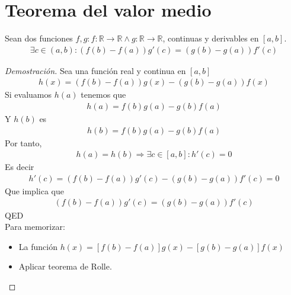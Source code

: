 \documentclass{article}
\begin{document}
\section{Teorema del valor medio}
    Sean dos funciones $f,g : f: \mathbb{R} \to \mathbb{R} \wedge g: \mathbb{R} \to \mathbb{R}$, continuas y derivables en $[a,b]$.
    \begin{equation}
        \begin{split}
            \exists c \in (a,b): (f(b)-f(a))g'(c) = (g(b) - g(a))f'(c)
        \end{split}
    \end{equation}
\begin{proof}[Demostración]
    Sea una función real y continua en $[a,b]$
    \begin{equation}
        \begin{split}
            h(x)= (f(b)-f(a))g(x)- (g(b)-g(a))f(x)
        \end{split}
    \end{equation}
    Si evaluamos $h(a)$ tenemos que
    \begin{equation}
        \begin{split}
            h(a)= f(b)g(a)-g(b)f(a)
        \end{split}
    \end{equation}
    Y $h(b)$ es
    \begin{equation}
        \begin{split}
            h(b)=f(b)g(a)-g(b)f(a)
        \end{split}
    \end{equation}
    Por tanto,
    \begin{equation}
        \begin{split}
            h(a)=h(b)\Rightarrow \exists c \in [a,b] : h'(c)=0
        \end{split}
    \end{equation}
    Es decir
    \begin{equation}
        \begin{split}
            h'(c)=(f(b)-f(a))g'(c)- (g(b)-g(a))f'(c)=0
        \end{split}
    \end{equation}
    Que implica que
    \begin{equation}
        \begin{split}
            (f(b)-f(a))g'(c)=(g(b)-g(a))f'(c)
        \end{split}
    \end{equation}
    QED\\
    Para memorizar:
    \begin{itemize}
	    \item La función $h(x) = [f(b)-f(a)]g(x) - [g(b)-g(a)]f(x)$
		\item Aplicar teorema de Rolle.
	\end{itemize}
\end{proof}
\end{document}
